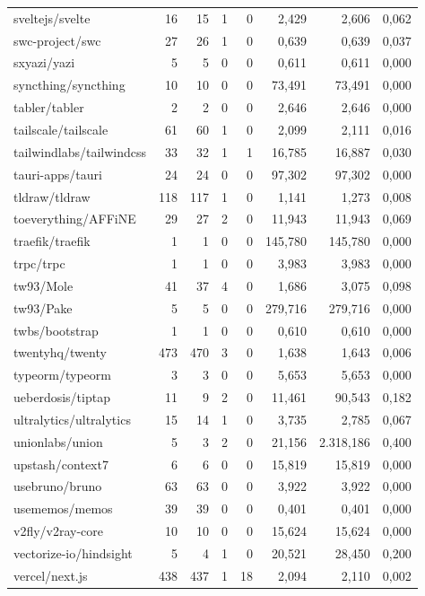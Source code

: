 \begin{tabular}{lrrrrrrr}
sveltejs/svelte & 16 & 15 & 1 & 0 & 2,429 & 2,606 & 0,062 \\
swc-project/swc & 27 & 26 & 1 & 0 & 0,639 & 0,639 & 0,037 \\
sxyazi/yazi & 5 & 5 & 0 & 0 & 0,611 & 0,611 & 0,000 \\
syncthing/syncthing & 10 & 10 & 0 & 0 & 73,491 & 73,491 & 0,000 \\
tabler/tabler & 2 & 2 & 0 & 0 & 2,646 & 2,646 & 0,000 \\
tailscale/tailscale & 61 & 60 & 1 & 0 & 2,099 & 2,111 & 0,016 \\
tailwindlabs/tailwindcss & 33 & 32 & 1 & 1 & 16,785 & 16,887 & 0,030 \\
tauri-apps/tauri & 24 & 24 & 0 & 0 & 97,302 & 97,302 & 0,000 \\
tldraw/tldraw & 118 & 117 & 1 & 0 & 1,141 & 1,273 & 0,008 \\
toeverything/AFFiNE & 29 & 27 & 2 & 0 & 11,943 & 11,943 & 0,069 \\
traefik/traefik & 1 & 1 & 0 & 0 & 145,780 & 145,780 & 0,000 \\
trpc/trpc & 1 & 1 & 0 & 0 & 3,983 & 3,983 & 0,000 \\
tw93/Mole & 41 & 37 & 4 & 0 & 1,686 & 3,075 & 0,098 \\
tw93/Pake & 5 & 5 & 0 & 0 & 279,716 & 279,716 & 0,000 \\
twbs/bootstrap & 1 & 1 & 0 & 0 & 0,610 & 0,610 & 0,000 \\
twentyhq/twenty & 473 & 470 & 3 & 0 & 1,638 & 1,643 & 0,006 \\
typeorm/typeorm & 3 & 3 & 0 & 0 & 5,653 & 5,653 & 0,000 \\
ueberdosis/tiptap & 11 & 9 & 2 & 0 & 11,461 & 90,543 & 0,182 \\
ultralytics/ultralytics & 15 & 14 & 1 & 0 & 3,735 & 2,785 & 0,067 \\
unionlabs/union & 5 & 3 & 2 & 0 & 21,156 & 2.318,186 & 0,400 \\
upstash/context7 & 6 & 6 & 0 & 0 & 15,819 & 15,819 & 0,000 \\
usebruno/bruno & 63 & 63 & 0 & 0 & 3,922 & 3,922 & 0,000 \\
usememos/memos & 39 & 39 & 0 & 0 & 0,401 & 0,401 & 0,000 \\
v2fly/v2ray-core & 10 & 10 & 0 & 0 & 15,624 & 15,624 & 0,000 \\
vectorize-io/hindsight & 5 & 4 & 1 & 0 & 20,521 & 28,450 & 0,200 \\
vercel/next.js & 438 & 437 & 1 & 18 & 2,094 & 2,110 & 0,002 \\

\end{tabular}
